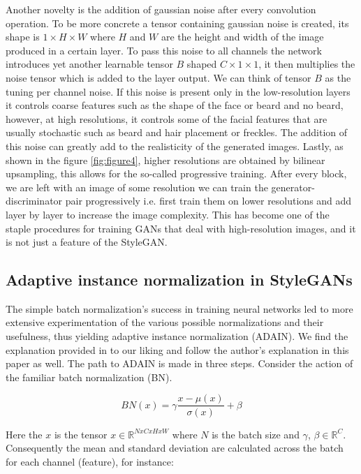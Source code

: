 \documentclass[conference]{IEEEtran}
\begin{document}
	Another novelty is the addition of gaussian noise after every convolution operation. To be more concrete a tensor containing gaussian noise is created, its shape is $1 \times H \times W$ where $H$ and $W$ are the height and width of the image produced in a certain layer. To pass this noise to all channels the network introduces yet another learnable tensor $B$ shaped $C \times 1 \times 1$, it then multiplies the noise tensor which is added to the layer output. We can think of tensor $B$ as the tuning per channel noise. If this noise is present only in the low-resolution layers it controls coarse features such as the shape of the face or beard and no beard, however, at high resolutions, it controls some of the facial features that are usually stochastic such as beard and hair placement or freckles. The addition of this noise can greatly add to the realisticity of the generated images.
Lastly, as shown in the figure \ref{fig:figure4}, higher resolutions are obtained by bilinear upsampling, this allows for the so-called progressive training. After every block, we are left with an image of some resolution we can train the generator-discriminator pair progressively i.e. first train them on lower resolutions and add layer by layer to increase the image complexity. This has become one of the staple procedures for training GANs that deal with high-resolution images, and it is not just a feature of the StyleGAN.



\subsection{Adaptive instance normalization in StyleGANs}
The simple batch normalization's success in training neural networks led to more extensive experimentation of the various possible normalizations and their usefulness, thus yielding adaptive instance normalization (ADAIN). We find the explanation provided in \cite{ADAIN} to our liking and follow the author's explanation in this paper as well.
The path to ADAIN is made in three steps. Consider the action of the familiar batch normalization (BN).

\begin{equation}
	\label{eq:1}
	BN(x) = \gamma \frac{x -  \mu(x)}{\sigma(x)} + \beta
\end{equation}

Here the $x$ is the tensor $x \in \mathbb{R}^{NxCxHxW}$ where $N$ is the batch size and $\gamma$,  $\beta \in \mathbb{R}^C$. Consequently the mean and standard deviation are calculated across the batch for each channel (feature), for instance:
\end{document}
